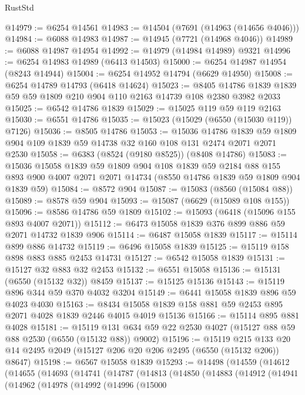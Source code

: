 \begin{lexlean}{RustStd}
\begin{coremodule}
@14979 := @6254 @14561
@14983 := @14504 (@7691 (@14963 (@14656 @4046)))
@14984 := @6088 @14983
@14987 := @14945 (@7721 (@14968 @4046))
@14989 := @6088 @14987 @14954
@14992 := @14979 (@14984 @14989) @9321
@14996 := @6254 @14983 @14989 (@6413 @14503)
@15000 := @6254 @14987 @14954 (@8243 @14944)
@15004 := @6254 @14952 @14794 (@6629 @14950)
@15008 := @6254 @14789 @14793 (@6418 @14624)
@15023 := @8405 @14786 @1839 @1839 @59 @59 @1809 @210 @904 @110 @2163 @14739 @108 @2380 @3982 @2033
@15025 := @6542 @14786 @1839
@15029 := @15025 @119 @59 @119 @2163
@15030 := @6551 @14786
@15035 := @15023 (@15029 (@6550 (@15030 @119)) @7126)
@15036 := @8505 @14786
@15053 := @15036
    @14786
    @1839
    @59
    @1809
    @904
    @109
    @1839
    @59
    @14738
    @32
    @160
    @108
    @131
    @2474
    @2071
    @2071
    @2530
@15058 := @6383 (@8524 (@9180 @8525)) (@8408 @14786)
@15083 := @15036
    @15058
    @1839
    @59
    @1809
    @904
    @108
    @1839
    @59
    @2184
    @88
    @155
    @893
    @900
    @4007
    @2071
    @2071
    @14734
    (@8550 @14786 @1839 @59 @1809 @904 @1839 @59)
@15084 := @8572 @904
@15087 := @15083 (@8560 (@15084 @88))
@15089 := @8578 @59 @904
@15093 := @15087 (@6629 (@15089 @108 @155))
@15096 := @8586 @14786 @59 @1809
@15102 := @15093 (@6418 (@15096 @155 @893 @4007 @2071))
@15112 := @6473 @15058 @1839 @376 @899 @886 @59 @2071 @14732 @1839 @906
@15114 := @6487 @15058 @1839
@15117 := @15114 @899 @886 @14732
@15119 := @6496 @15058 @1839
@15125 := @15119 @158 @898 @883 @885 @2453 @14731
@15127 := @6542 @15058 @1839
@15131 := @15127 @32 @883 @32 @2453
@15132 := @6551 @15058
@15136 := @15131 (@6550 (@15132 @32)) @8459
@15137 := @15125 @15136
@15143 := @15119 @896 @344 @59 @370 @4032 @3204
@15149 := @6441 @15058 @1839 @896 @59 @4023 @4030
@15163 := @8434 @15058 @1839 @158 @881 @59 @2453 @895 @2071 @4028 @1839 @2446 @4015 @4019 @15136
@15166 := @15114 @895 @881 @4028
@15181 := @15119 @131 @634 @59 @22 @2530 @4027 (@15127 @88 @59 @88 @2530 (@6550 (@15132 @88)) @9002)
@15196 := @15119
    @215
    @133
    @20
    @14
    @2495
    @2049
    (@15127 @206 @20 @206 @2495 (@6550 (@15132 @206)) @8647)
@15198 := @6567 @15058 @1839
@15293 := @14498
    (@14559
      (@14612
        (@14655
          (@14693
            (@14741
              (@14787
                (@14813
                  (@14850
                    (@14883
                      (@14912
                        (@14941
                          (@14962
                            (@14978
                              (@14992
                                (@14996
                                  (@15000

\end{coremodule}
\end{lexlean}
